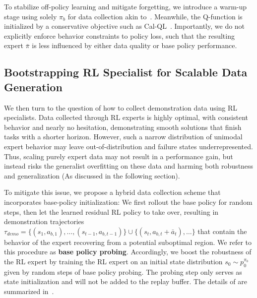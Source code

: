 To stabilize off-policy learning and mitigate forgetting, we introduce a warm-up stage using solely $\pi_b$ for data collection akin to~\citep{WSRL}. Meanwhile, the Q-function is initialized by a conservative objective such as Cal-QL~\citep{cal-QL}. Importantly, we do not explicitly enforce behavior constraints to policy loss, such that the resulting expert \(\bar{\pi}\) is less influenced by either data quality or base policy performance.

\subsection{Bootstrapping RL Specialist for Scalable Data Generation}
We then turn to the question of how to collect demonstration data using RL specialists. Data collected through RL experts is highly optimal, with consistent behavior and nearly no hesitation, demonstrating smooth solutions that finish tasks with a shorter horizon. However, such a narrow distribution of unimodal expert behavior may leave out-of-distribution and failure states underrepresented. Thus, scaling purely expert data may not result in a performance gain, but instead risks the generalist overfitting on these data and harming both robustness and generalization (As discussed in the following section).

To mitigate this issue, we propose a hybrid data collection scheme that incorporates base-policy initialization: We first rollout the base policy for random steps, then let the learned residual RL policy to take over, resulting in demonstration trajectories $\tau_{demo} = \{ (s_1, a_{b,1}),\dots, (s_{t-1}, a_{b,t-1})\} \cup \{(s_t, a_{b,t}+\bar{a}_t), \dots \}$ that contain the behavior of the expert recovering from a potential suboptimal region. We refer to this procedure as \textbf{base policy probing}. Accordingly, we boost the robustness of the RL expert by training the RL expert on an initial state distribution $s_0 \sim p_0^{\pi_b}$ given by random steps of base policy probing. The probing step only serves as state initialization and will not be added to the replay buffer. The details of \method are summarized in~.